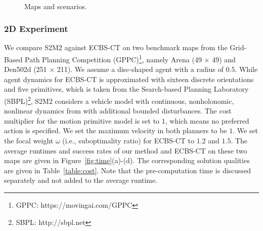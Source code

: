 \documentclass[letterpaper]{article} %
\theoremstyle{definition}
\begin{document}
\begin{figure}[t]
  
    \centering
    \,\,\,\,\,\,
    \,\,\,\,\,\,
    \caption{Maps and scenarios.}
    \label{fig:map}

\end{figure}

\subsubsection{2D Experiment}
We compare S2M2 against ECBS-CT on two benchmark maps from the Grid-Based Path Planning Competition (GPPC)\footnote{GPPC: https://movingai.com/GPPC}, namely Arena (49 $\times$ 49) and Den502d (251 $\times$ 211). %
We assume a disc-shaped agent with a radius of $0.5$. While agent dynamics for ECBS-CT is approximated with sixteen discrete orientations and five primitives, which is taken from the Search-based Planning Laboratory (SBPL)\footnote{
SBPL: http://sbpl.net}, S2M2 considers a vehicle model with continuous, nonholonomic, nonlinear dynamics from \cite{rodriguez2014trajectory} with additional bounded disturbances.  The cost multiplier for the motion primitive model is set to $1$, which means no preferred action is specified. We set the maximum velocity in both planners to be $1$. We set the focal weight $\omega$ (i.e., suboptimality ratio) for ECBS-CT to $1.2$ and $1.5$. The average runtimes and success rates of our method and ECBS-CT on these two maps are given in Figure~\ref{fig:time}(a)-(d). The corresponding solution qualities are given in Table~\ref{table:cost}. Note that the pre-computation time is discussed separately and not added to the average runtime.
\end{document}
